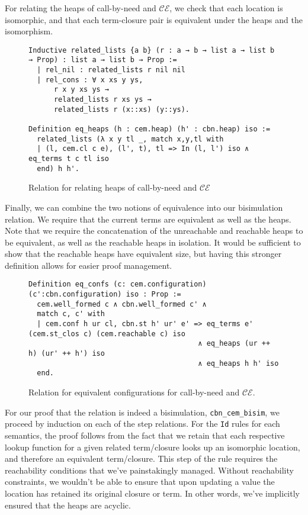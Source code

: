 For relating the heaps of call-by-need and $\mathcal{CE}$, we check that each
location is isomorphic, and that each term-closure pair is equivalent under
the heaps and the isomorphism.  

\begin{figure}
\begin{lstlisting}
Inductive related_lists {a b} (r : a → b → list a → list b → Prop) : list a → list b → Prop :=
  | rel_nil : related_lists r nil nil
  | rel_cons : ∀ x xs y ys, 
      r x y xs ys → 
      related_lists r xs ys → 
      related_lists r (x::xs) (y::ys).

Definition eq_heaps (h : cem.heap) (h' : cbn.heap) iso := 
  related_lists (λ x y tl _, match x,y,tl with
  | (l, cem.cl c e), (l', t), tl => In (l, l') iso ∧ eq_terms t c tl iso
  end) h h'.
\end{lstlisting}
\caption{Relation for relating heaps of call-by-need and $\mathcal{CE}$}
\label{fig:eqheaps}
\end{figure}

Finally, we can combine the two notions of equivalence into our bisimulation
relation. We require that the current terms are equivalent as well as the heaps.
Note that we require the concatenation of the unreachable and reachable heaps to
be equivalent, as well as the reachable heaps in isolation. It would be
sufficient to show that the reachable heaps have equivalent size, but having
this stronger definition allows for easier proof management. 

\begin{figure}
\begin{lstlisting}
Definition eq_confs (c: cem.configuration) (c':cbn.configuration) iso : Prop := 
  cem.well_formed c ∧ cbn.well_formed c' ∧ 
  match c, c' with
  | cem.conf h ur cl, cbn.st h' ur' e' => eq_terms e' (cem.st_clos c) (cem.reachable c) iso
                                        ∧ eq_heaps (ur ++ h) (ur' ++ h') iso
                                        ∧ eq_heaps h h' iso
  end.
\end{lstlisting}
\caption{Relation for equivalent configurations for call-by-need and
$\mathcal{CE}$.}
\label{fig:eqconfs}
\end{figure}

For our proof that the relation is indeed a bisimulation,
\texttt{cbn\_cem\_bisim}, we proceed by induction on each of the step relations.
For the \texttt{Id} rules for each semantics, the proof follows from the fact
that we retain that each respective lookup function for a given related
term/closure looks up an isomorphic location, and therefore an equivalent
term/closure. This step of the rule requires the reachability conditions that
we've painstakingly managed. Without reachability constraints, we wouldn't be
able to ensure that upon updating a value the location has retained its original
closure or term. In other words, we've implicitly ensured that the heaps are
acyclic. 

